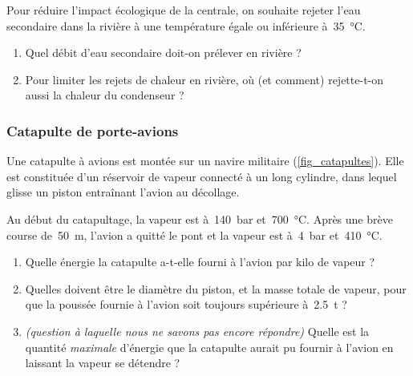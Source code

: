 	Pour réduire l’impact écologique de la centrale, on souhaite rejeter l’eau secondaire dans la rivière à une température égale ou inférieure à~\SI{35}{\degreeCelsius}.
	
	\begin{enumerate}
		\item Quel débit d’eau secondaire doit-on prélever en rivière ?
		\item Pour limiter les rejets de chaleur en rivière, où (et comment) rejette-t-on aussi la chaleur du condenseur ?
	\end{enumerate}
	

\subsubsection{Catapulte de porte-avions}

	Une catapulte à avions est montée sur un navire militaire (\cref{fig_catapultes}). Elle est constituée d’un réservoir de vapeur connecté à un long cylindre, dans lequel glisse un piston entraînant l’avion au décollage.
	
	Au début du catapultage, la vapeur est à~\SI{140}{\bar} et~\SI{700}{\degreeCelsius}. Après une brève course de~\SI{50}{\metre}, l’avion a quitté le pont et la vapeur est à~\SI{4}{\bar} et~\SI{410}{\degreeCelsius}.
	
	\begin{enumerate}
		\item Quelle énergie la catapulte a-t-elle fourni à l’avion par kilo de vapeur ?
		\item Quelles doivent être le diamètre du piston, et la masse totale de vapeur, pour que la poussée fournie à l’avion soit toujours supérieure à~\SI{2,5}{\tonne} ?
		\item \textit{(question à laquelle nous ne savons pas encore répondre)} Quelle est la quantité \emph{maximale} d’énergie que la catapulte aurait pu fournir à l’avion en laissant la vapeur se détendre ?
	\end{enumerate}
	
